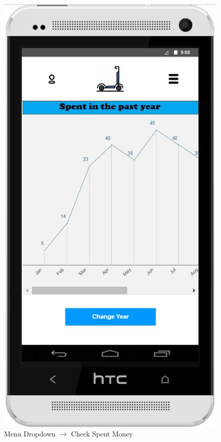\documentclass[a4paper, 12pt]{article}
\begin{document}
\begin{figure} [htbp]
  \begin{center}
    \includegraphics[scale=0.75]{images/prototypes/02-04-menu-dropdown--check-spent-money.png}
  \end{center}
  \caption{Menu Dropdown $\rightarrow$ Check Spent Money}
\end{figure}
\end{document}
